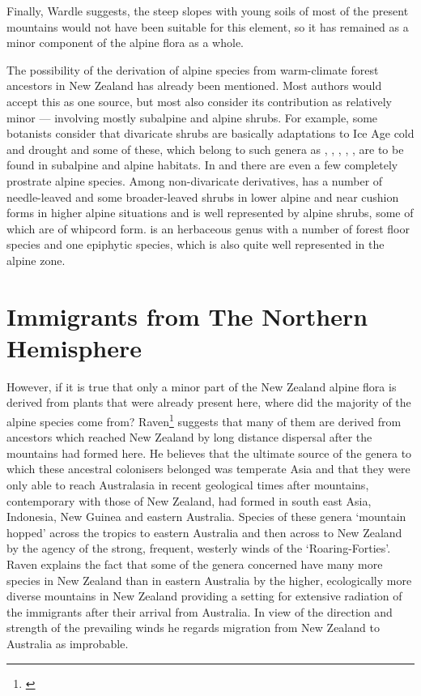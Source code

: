 Finally, Wardle suggests, the steep slopes with young soils of most of the present mountains would not have been suitable for this element, so it has remained as a minor component of the alpine flora as a whole.

The possibility of the derivation of alpine species from warm-climate forest ancestors in New Zealand has already been mentioned.
Most authors would accept this as one source, but most also consider its contribution as relatively minor --- involving mostly subalpine and alpine shrubs.
For example, some botanists consider that divaricate shrubs are basically adaptations to Ice Age cold and drought and some of these, which belong to such genera as , , , , , are to be found in subalpine and alpine habitats.
In  and  there are even a few completely prostrate alpine species.
Among non-divaricate derivatives,  has a number of needle-leaved and some broader-leaved shrubs in lower alpine and near cushion forms in higher alpine situations and  is well represented by alpine shrubs, some of which are of whipcord form.  is an herbaceous genus with a number of forest floor species and one epiphytic species, which is also quite well represented in the alpine zone.

\section{Immigrants from The Northern Hemisphere}

However, if it is true that only a minor part of the New Zealand alpine flora is derived from plants that were already present here, where did the majority of the alpine species come from? Raven\footnote{\cite{raven1973evolution}} suggests that many of them are derived from ancestors which reached New Zealand by long distance dispersal after the mountains had formed here.
He believes that the ultimate source of the genera to which these ancestral colonisers belonged was temperate Asia and that they were only able to reach Australasia in recent geological times after mountains, contemporary with those of New Zealand, had formed in south east Asia, Indonesia, New Guinea and eastern Australia.
Species of these genera `mountain hopped' across the tropics to eastern Australia and then across to New Zealand by the agency of the strong, frequent, westerly winds of the `Roaring-Forties'.
Raven explains the fact that some of the genera concerned have many more species in New Zealand than in eastern Australia by the higher, ecologically more diverse mountains in New Zealand providing a setting for extensive radiation of the immigrants after their arrival from Australia.
In view of the direction and strength of the prevailing winds he regards migration from New Zealand to Australia as improbable.

